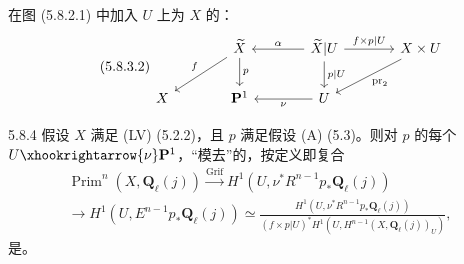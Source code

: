 在图 (5.8.2.1) 中加入 $U$ 上为 $X$ 的：
\begin{equation}\tag{5.8.3.2}
\begin{tikzcd}[column sep=large]
&\widetilde X\arrow[dl,"f"']\arrow[d,"p"]&\widetilde X|U\arrow[l,"\alpha"']\arrow[d,"p|U"]\arrow[r,"f\times p|U"]&X\times U\arrow[dl,"\operatorname{pr}_2"]\\
X&\mathbf P^1&U\arrow[l,"\nu"]&
\end{tikzcd}
\end{equation}
\begin{SGAresult}{}{5.8.4}
假设 $X$ 满足 (LV) (5.2.2)，且 $p$ 满足假设 (A) (5.3)。则对 $p$ 的每个 $U\xhookrightarrow{\nu}\mathbf P^1$，“模去”的，按定义即复合
\begin{equation}\tag{5.8.4.1}\begin{gathered}
\operatorname{Prim}^n(X,\mathbf Q_\ell(j))\xrightarrow{\operatorname{Grif}}H^1(U,\nu^*R^{n-1}p_*\mathbf Q_\ell(j))\\
\longrightarrow H^1(U,E^{n-1}p_*\mathbf Q_\ell(j))\simeq\frac{H^1(U,\nu^*R^{n-1}p_*\mathbf Q_\ell(j))}{(f\times p|U)^*H^1(U,H^{n-1}(X,\mathbf Q_\ell(j))_U)},
\end{gathered}\end{equation}
是。
\end{SGAresult}
